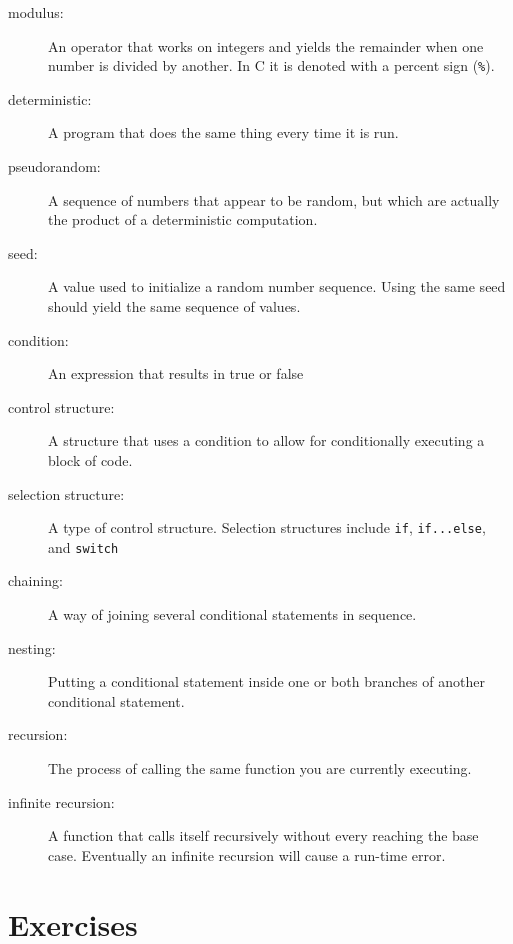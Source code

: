 \begin{description}

\item[modulus:]  An operator that works on integers and yields
the remainder when one number is divided by another.  In C
it is denoted with a percent sign ({\tt \%}).

\item[deterministic:]  A program that does the same thing every
time it is run.

\item[pseudorandom:]  A sequence of numbers that appear to be
random, but which are actually the product of a deterministic
computation.

\item[seed:]  A value used to initialize a random number sequence.
Using the same seed should yield the same sequence of values.

\item[condition:]  An expression that results in true or false


\item[control structure:]  A structure that uses a condition to allow for conditionally executing a block of code. 

\item[selection structure:]  A type of control structure. Selection structures include {\tt if}, {\tt if...else}, and {\tt switch}

\item[chaining:]  A way of joining several conditional statements
in sequence.

\item[nesting:] Putting a conditional statement inside one or both
branches of another conditional statement.

\item[recursion:]  The process of calling the same function you
are currently executing.

\item[infinite recursion:]  A function that calls itself
recursively without every reaching the base case.  Eventually
an infinite recursion will cause a run-time error.


\end{description}


\section{Exercises}
\setcounter{exercisenum}{0}





